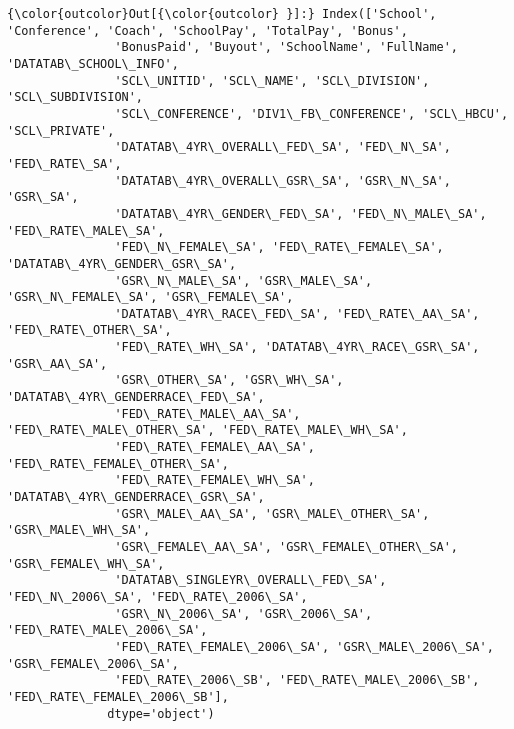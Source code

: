 \documentclass[11pt]{article}
\begin{document}
\begin{Verbatim}[commandchars=\\\{\}]
{\color{outcolor}Out[{\color{outcolor} }]:} Index(['School', 'Conference', 'Coach', 'SchoolPay', 'TotalPay', 'Bonus',
               'BonusPaid', 'Buyout', 'SchoolName', 'FullName', 'DATATAB\_SCHOOL\_INFO',
               'SCL\_UNITID', 'SCL\_NAME', 'SCL\_DIVISION', 'SCL\_SUBDIVISION',
               'SCL\_CONFERENCE', 'DIV1\_FB\_CONFERENCE', 'SCL\_HBCU', 'SCL\_PRIVATE',
               'DATATAB\_4YR\_OVERALL\_FED\_SA', 'FED\_N\_SA', 'FED\_RATE\_SA',
               'DATATAB\_4YR\_OVERALL\_GSR\_SA', 'GSR\_N\_SA', 'GSR\_SA',
               'DATATAB\_4YR\_GENDER\_FED\_SA', 'FED\_N\_MALE\_SA', 'FED\_RATE\_MALE\_SA',
               'FED\_N\_FEMALE\_SA', 'FED\_RATE\_FEMALE\_SA', 'DATATAB\_4YR\_GENDER\_GSR\_SA',
               'GSR\_N\_MALE\_SA', 'GSR\_MALE\_SA', 'GSR\_N\_FEMALE\_SA', 'GSR\_FEMALE\_SA',
               'DATATAB\_4YR\_RACE\_FED\_SA', 'FED\_RATE\_AA\_SA', 'FED\_RATE\_OTHER\_SA',
               'FED\_RATE\_WH\_SA', 'DATATAB\_4YR\_RACE\_GSR\_SA', 'GSR\_AA\_SA',
               'GSR\_OTHER\_SA', 'GSR\_WH\_SA', 'DATATAB\_4YR\_GENDERRACE\_FED\_SA',
               'FED\_RATE\_MALE\_AA\_SA', 'FED\_RATE\_MALE\_OTHER\_SA', 'FED\_RATE\_MALE\_WH\_SA',
               'FED\_RATE\_FEMALE\_AA\_SA', 'FED\_RATE\_FEMALE\_OTHER\_SA',
               'FED\_RATE\_FEMALE\_WH\_SA', 'DATATAB\_4YR\_GENDERRACE\_GSR\_SA',
               'GSR\_MALE\_AA\_SA', 'GSR\_MALE\_OTHER\_SA', 'GSR\_MALE\_WH\_SA',
               'GSR\_FEMALE\_AA\_SA', 'GSR\_FEMALE\_OTHER\_SA', 'GSR\_FEMALE\_WH\_SA',
               'DATATAB\_SINGLEYR\_OVERALL\_FED\_SA', 'FED\_N\_2006\_SA', 'FED\_RATE\_2006\_SA',
               'GSR\_N\_2006\_SA', 'GSR\_2006\_SA', 'FED\_RATE\_MALE\_2006\_SA',
               'FED\_RATE\_FEMALE\_2006\_SA', 'GSR\_MALE\_2006\_SA', 'GSR\_FEMALE\_2006\_SA',
               'FED\_RATE\_2006\_SB', 'FED\_RATE\_MALE\_2006\_SB', 'FED\_RATE\_FEMALE\_2006\_SB'],
              dtype='object')
\end{Verbatim}
            
\end{document}
